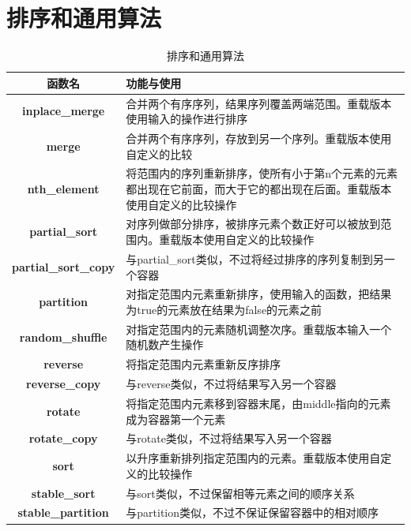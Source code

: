 \documentclass[UTF8,a4paper,12pt]{ctexbook}
\begin{document}
	\section{排序和通用算法}
	\begin{table}[H]
		\centering
		\caption{排序和通用算法}
		\begin{tabular}{c|m{13cm}}
			\hline 
			函数名 & 功能与使用\\
			\hline
			\textbf{inplace\_merge}	& 合并两个有序序列，结果序列覆盖两端范围。重载版本使用输入的操作进行排序\\
			\hline 
			\textbf{merge}  & 合并两个有序序列，存放到另一个序列。重载版本使用自定义的比较\\
			\hline 
			\textbf{nth\_element}  & 将范围内的序列重新排序，使所有小于第n个元素的元素都出现在它前面，而大于它的都出现在后面。重载版本使用自定义的比较操作\\
			\hline 
			\textbf{partial\_sort}  & 对序列做部分排序，被排序元素个数正好可以被放到范围内。重载版本使用自定义的比较操作\\
			\hline 
			\textbf{partial\_sort\_copy}  & 与partial\_sort类似，不过将经过排序的序列复制到另一个容器\\
			\hline 
			\textbf{partition}	&对指定范围内元素重新排序，使用输入的函数，把结果为true的元素放在结果为false的元素之前	\\
			\hline 
			\textbf{random\_shuffle}	& 对指定范围内的元素随机调整次序。重载版本输入一个随机数产生操作	\\
			\hline 
			\textbf{reverse}	&将指定范围内元素重新反序排序	\\
			\hline 
			\textbf{reverse\_copy}	&与reverse类似，不过将结果写入另一个容器	\\
			\hline 
			\textbf{rotate}	&将指定范围内元素移到容器末尾，由middle指向的元素成为容器第一个元素\\
			\hline 
			\textbf{rotate\_copy}		&与rotate类似，不过将结果写入另一个容器	\\
			\hline 
			\textbf{sort}	& 以升序重新排列指定范围内的元素。重载版本使用自定义的比较操作	\\
			\hline 
			\textbf{stable\_sort}	& 与sort类似，不过保留相等元素之间的顺序关系\\
			\hline
			\textbf{stable\_partition}	& 与partition类似，不过不保证保留容器中的相对顺序\\
			\hline
		\end{tabular}
	\end{table}	
\end{document}
